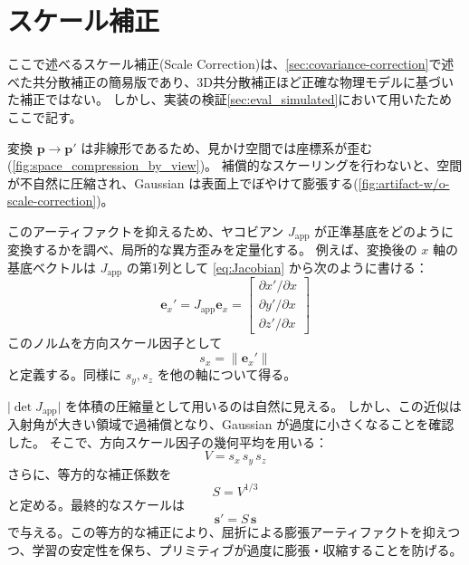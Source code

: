 \newpage
\section{スケール補正}\label{sec:scale-correction}

ここで述べるスケール補正(Scale Correction)は、\cref{sec:covariance-correction}で述べた共分散補正の簡易版であり、3D共分散補正ほど正確な物理モデルに基づいた補正ではない。
しかし、実装の検証\cref{sec:eval_simulated}において用いたためここで記す。


変換 $\mathbf{p}\rightarrow\mathbf{p}'$ は非線形であるため、見かけ空間では座標系が歪む(\cref{fig:space_compression_by_view})。
補償的なスケーリングを行わないと、空間が不自然に圧縮され、Gaussian は表面上でぼやけて膨張する(\cref{fig:artifact-w/o-scale-correction})。



このアーティファクトを抑えるため、ヤコビアン $J_{\text{app}}$ が正準基底をどのように変換するかを調べ、局所的な異方歪みを定量化する。
例えば、変換後の $x$ 軸の基底ベクトルは $J_{\text{app}}$ の第1列として
\cref{eq:Jacobian} から次のように書ける：
\begin{equation}
  \bm{e}_x'=
  J_{\text{app}}\bm{e}_x=
    \begin{bmatrix}
        \partial x'/\partial x \\
        \partial y'/\partial x \\
        \partial z'/\partial x
    \end{bmatrix}
\end{equation}
このノルムを方向スケール因子として
\begin{equation}
  s_x=\|\bm{e}_x'\|
\end{equation}
と定義する。同様に $s_y, s_z$ を他の軸について得る。

$\lvert\det J_{\text{app}}\rvert$ を体積の圧縮量として用いるのは自然に見える。
しかし、この近似は入射角が大きい領域で過補償となり、Gaussian が過度に小さくなることを確認した。
そこで、方向スケール因子の幾何平均を用いる：
\begin{equation}
  V=s_x\,s_y\,s_z
  \label{eq:volume-compression-ratio}
\end{equation}
さらに、等方的な補正係数を
\begin{equation}
  S = V^{1/3}
  \label{scale-correction-factor}
\end{equation}
と定める。最終的なスケールは
\begin{equation}
  \bm{s}' = S\,\bm{s}
  \label{eq:scale-correction-edge}
\end{equation}
で与える。この等方的な補正により、屈折による膨張アーティファクトを抑えつつ、学習の安定性を保ち、プリミティブが過度に膨張・収縮することを防げる。
